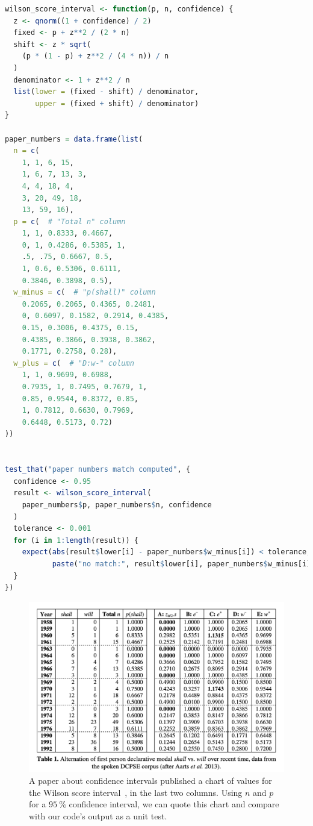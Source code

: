 \documentclass[fleqn,10pt]{olplainarticle}
\begin{document}
\begin{lstlisting}[language=R]
wilson_score_interval <- function(p, n, confidence) {
  z <- qnorm((1 + confidence) / 2)
  fixed <- p + z**2 / (2 * n)
  shift <- z * sqrt(
    (p * (1 - p) + z**2 / (4 * n)) / n
  )
  denominator <- 1 + z**2 / n
  list(lower = (fixed - shift) / denominator,
       upper = (fixed + shift) / denominator)
}

paper_numbers = data.frame(list(
  n = c(
    1, 1, 6, 15,
    1, 6, 7, 13, 3,
    4, 4, 18, 4,
    3, 20, 49, 18,
    13, 59, 16),
  p = c(  # "Total n" column
    1, 1, 0.8333, 0.4667,
    0, 1, 0.4286, 0.5385, 1,
    .5, .75, 0.6667, 0.5,
    1, 0.6, 0.5306, 0.6111,
    0.3846, 0.3898, 0.5),
  w_minus = c(  # "p(shall)" column
    0.2065, 0.2065, 0.4365, 0.2481,
    0, 0.6097, 0.1582, 0.2914, 0.4385,
    0.15, 0.3006, 0.4375, 0.15,
    0.4385, 0.3866, 0.3938, 0.3862,
    0.1771, 0.2758, 0.28),
  w_plus = c(  # "D:w-" column
    1, 1, 0.9699, 0.6988,
    0.7935, 1, 0.7495, 0.7679, 1,
    0.85, 0.9544, 0.8372, 0.85,
    1, 0.7812, 0.6630, 0.7969,
    0.6448, 0.5173, 0.72)
))


test_that("paper numbers match computed", {
  confidence <- 0.95
  result <- wilson_score_interval(
    paper_numbers$p, paper_numbers$n, confidence
  )
  tolerance <- 0.001
  for (i in 1:length(result)) {
    expect(abs(result$lower[i] - paper_numbers$w_minus[i]) < tolerance,
           paste("no match:", result$lower[i], paper_numbers$w_minus[i]))
  }
})
\end{lstlisting}

\begin{figure}
    \centering
    \includegraphics[scale=0.4]{wilson_chart.pdf}
    \caption{A paper about confidence intervals published a chart of values for
    the Wilson score interval~\citep{wallis2013binomial}, in the last two columns. Using $n$ and $p$
    for a $95\:\%$ confidence interval, we can quote this chart and compare with
    our code's output as a unit test.}
    \label{fig:wilson_chart}
\end{figure}
\end{document}
